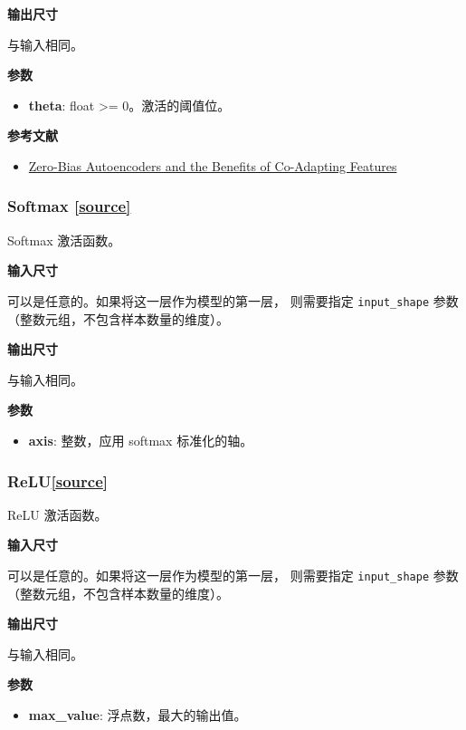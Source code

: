 \textbf{输出尺寸}

与输入相同。

\textbf{参数}

\begin{itemize}
\tightlist
\item
  \textbf{theta}: float \textgreater{}= 0。激活的阈值位。
\end{itemize}

\textbf{参考文献}

\begin{itemize}
\tightlist
\item
  \href{http://arxiv.org/abs/1402.3337}{Zero-Bias Autoencoders and the
  Benefits of Co-Adapting Features}
\end{itemize}



\subsubsection{Softmax {\href{https://github.com/keras-team/keras/blob/master/keras/layers/advanced_activations.py\#L230}{{[}source{]}}}}

\begin{Shaded}
\begin{Highlighting}[]
\OperatorTok{=-}\NormalTok{)}
\end{Highlighting}
\end{Shaded}

Softmax 激活函数。

\textbf{输入尺寸}

可以是任意的。如果将这一层作为模型的第一层， 则需要指定
\texttt{input\_shape} 参数 （整数元组，不包含样本数量的维度）。

\textbf{输出尺寸}

与输入相同。

\textbf{参数}

\begin{itemize}
\tightlist
\item
  \textbf{axis}: 整数，应用 softmax 标准化的轴。
\end{itemize}


\subsubsection{ReLU{\href{https://github.com/keras-team/keras/blob/master/keras/layers/advanced_activations.py\#L262}{{[}source{]}}}}

\begin{Shaded}
\begin{Highlighting}[]
\OperatorTok{=}\NormalTok{)}
\end{Highlighting}
\end{Shaded}

ReLU 激活函数。

\textbf{输入尺寸}

可以是任意的。如果将这一层作为模型的第一层， 则需要指定
\texttt{input\_shape} 参数 （整数元组，不包含样本数量的维度）。

\textbf{输出尺寸}

与输入相同。

\textbf{参数}

\begin{itemize}
\tightlist
\item
  \textbf{max\_value}: 浮点数，最大的输出值。
\end{itemize}

\newpage

